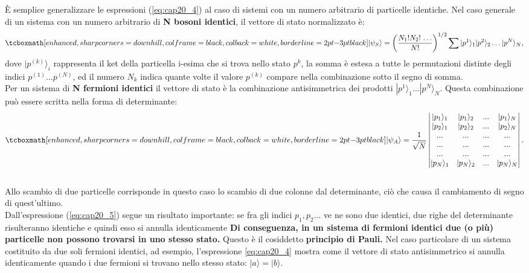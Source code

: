 \documentclass[a4paper,12pt,oneside]{book}
\begin{document}
È semplice generalizzare le espressioni (\ref{eq:cap20_4}) al caso di sistemi con un numero arbitrario di particelle identiche. Nel caso generale di un sistema con un numero arbitrario di \textbf{N bosoni identici}, il vettore di stato normalizzato è:\\
	\begin{equation}
		\tcboxmath[enhanced, sharp corners=downhill, colframe=black, colback=white, borderline={2pt}{-3pt}{black}]{
			|\psi _S\rangle= \left(\frac{N_{1}! N_{2}!\,\dots}{N!}\right)^{1/2}   \sum  |p^1\rangle_{1} |p^2\rangle_{2} \dots |p^N\rangle_{N} , 
			}
	\end{equation}
dove $|p^{(k)}\rangle_i$ rappresenta il ket della particella i-esima che si trova nello stato $p^k$, la somma \`e estesa a tutte le permutazioni distinte degli indici $p^{(1)}...p^{(N)}$, ed il numero $N_{k}$ indica quante volte il valore $p^{(k)}$ compare nella combinazione sotto il segno di somma.\\

Per un sistema di \textbf{N fermioni identici} il vettore di stato \`e la combinazione antisimmetrica dei prodotti $|p^1\rangle_1...|p^N\rangle_N$. Questa combinazione pu\`o essere scritta nella forma di determinante:
	\begin{equation}
		\tcboxmath[enhanced, sharp corners=downhill, colframe=black, colback=white, borderline={2pt}{-3pt}{black}]{
			|\psi _A\rangle= \frac{1}{\sqrt{N}} \begin{vmatrix} |p_{1}\rangle_1 & |p_{1}\rangle_2 & ... & |p_{1}\rangle_N \\|p_{2}\rangle_1 & |p_{2}\rangle_2 & ... & |p_{2}\rangle_N \\ ... & ... & ... & ... \\ ... & ... & ... & ... \\ ... & ... & ... & ... \\|p_{N}\rangle_1 & |p_{N}\rangle_2 & ... & |p_{N}\rangle_N\end{vmatrix}.
			}
	\label{eq:cap20_5}
	\end{equation}\\
	
Allo scambio di due particelle corrisponde in questo caso lo scambio di due colonne dal determinante, ciò che causa il cambiamento di segno di quest'ultimo.\\

Dall'espressione (\ref{eq:cap20_5}) segue un risultato importante: se fra gli indici $p_1, p_2...$ ve ne sono due identici, due righe del determinante risulteranno identiche e quindi esso si annulla identicamente \textbf{Di conseguenza, in un sistema di fermioni identici due (o pi\`u) particelle non possono trovarsi in uno stesso stato.} Questo è il cosiddetto \textbf{principio di Pauli.} Nel caso particolare di un sistema costituito da due soli fermioni identici, ad esempio, l'espressione \ref{eq:cap20_4} mostra come il vettore di stato antisimmetrico si annulla identicamente quando i due fermioni si trovano nello stesso stato: $|a\rangle= |b\rangle$.\\
\end{document}
